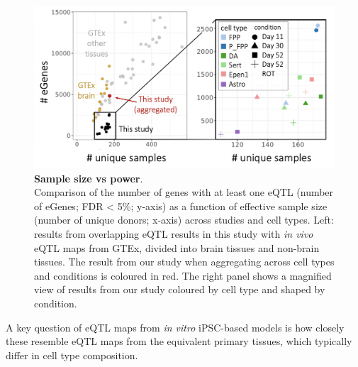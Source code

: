 \vspace{2mm}

\begin{figure}[h]
\includegraphics[width=15cm]{Chapter5/Fig/neuroseq_eqtl_gtex_scatterplot.png}
\caption[Sample size vs power]{\textbf{Sample size vs power}.\\
Comparison of the number of genes with at least one eQTL (number of eGenes; FDR < 5\%; y-axis) as a function of effective sample size (number of unique donors; x-axis) across studies and cell types. 
Left: results from overlapping eQTL results in this study with \textit{in vivo} eQTL maps from GTEx, divided into brain tissues and non-brain tissues. 
The result from our study when aggregating across cell types and conditions is coloured in red. 
The right panel shows a magnified view of results from our study coloured by cell type and shaped by condition.}
\label{fig:neuroseq_and_gtex_power}
\end{figure}

\newpage


A key question of eQTL maps from \textit{in vitro} iPSC-based models is how closely these resemble eQTL maps from the equivalent primary tissues, which typically differ in cell type composition. \\ 

